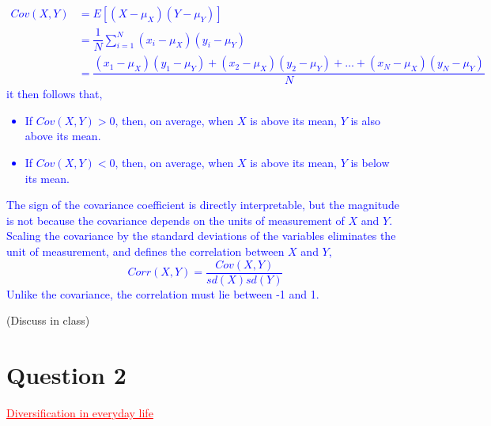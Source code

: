 \documentclass[12pt]{report}
\newenvironment{blueframed}[1][blue]
{\def\FrameCommand{\fboxsep=\FrameSep\fcolorbox{#1}{white}}%
\MakeFramed {\advance\hsize-\width \FrameRestore}}
{\endMakeFramed}
\begin{document}
\justify
\begin{blueframed}
	\vspace{-\baselineskip}
	\justify
	\textcolor{blue}{\vspace{-\baselineskip}\begin{align*}
		Cov(X,Y) &= E[(X-\mu_X)(Y-\mu_Y)] \\
		&= \dfrac{1}{N}\sum_{i=1}^{N}(x_i-\mu_X)(y_i-\mu_Y) \\
		&= \dfrac{(x_1-\mu_X)(y_1-\mu_Y) + (x_2-\mu_X)(y_2-\mu_Y) + \dots + (x_N-\mu_X)(y_N-\mu_Y)}{N}
		\end{align*} it then follows that, \begin{itemize}
			\item If $Cov(X,Y) > 0$, then, on average, when $X$ is above its mean, $Y$ is also above its mean.
			\item If $Cov(X,Y) < 0$, then, on average, when $X$ is above its mean, $Y$ is below its mean.
	\end{itemize} The sign of the covariance coefficient is directly interpretable, but the magnitude is not because the covariance depends on the units of measurement of $X$ and $Y$. Scaling the covariance by the standard deviations of the variables eliminates the unit of measurement, and defines the correlation between $X$ and $Y$, $$Corr(X,Y) = \dfrac{Cov(X,Y)}{sd(X)sd(Y)}$$ Unlike the covariance, the correlation must lie between -1 and 1.}
\end{blueframed}
\noindent (Discuss in class)

\newpage
\section*{Question 2}
\textcolor{red}{\underline{Diversification in everyday life}}
\end{document}

